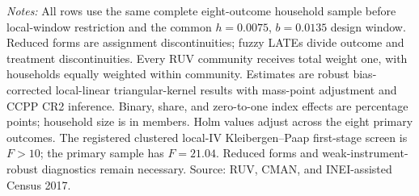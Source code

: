 \parbox{0.97\linewidth}{\footnotesize \textit{Notes:} All rows use the same complete eight-outcome household sample before local-window restriction and the common \(h=0.0075\), \(b=0.0135\) design window. Reduced forms are assignment discontinuities; fuzzy LATEs divide outcome and treatment discontinuities. Every RUV community receives total weight one, with households equally weighted within community. Estimates are robust bias-corrected local-linear triangular-kernel results with mass-point adjustment and CCPP CR2 inference. Binary, share, and zero-to-one index effects are percentage points; household size is in members. Holm values adjust across the eight primary outcomes. The registered clustered local-IV Kleibergen--Paap first-stage screen is \(F>10\); the primary sample has \(F=21.04\). Reduced forms and weak-instrument-robust diagnostics remain necessary. Source: RUV, CMAN, and INEI-assisted Census 2017.}
\par{}\par\endgroup
